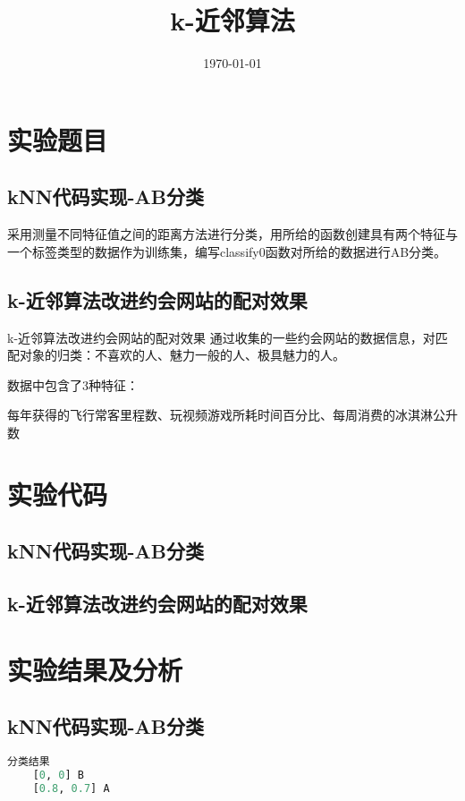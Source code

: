 \documentclass{../source/Experiment}
\title{k-近邻算法}
\date{\today}
\begin{document}
\makecover
\section{实验题目}
\subsection{kNN代码实现-AB分类}
采用测量不同特征值之间的距离方法进行分类，用所给的函数创建具有两个特征与一个标签类型的数据作为训练集，编写classify0函数对所给的数据进行AB分类。
\subsection{k-近邻算法改进约会网站的配对效果}
k-近邻算法改进约会网站的配对效果
通过收集的一些约会网站的数据信息，对匹配对象的归类：不喜欢的人、魅力一般的人、极具魅力的人。

数据中包含了3种特征：

每年获得的飞行常客里程数、玩视频游戏所耗时间百分比、每周消费的冰淇淋公升数

\section{实验代码}
\subsection{kNN代码实现-AB分类}


\subsection{k-近邻算法改进约会网站的配对效果}

\section{实验结果及分析}
\subsection{kNN代码实现-AB分类}
\begin{lstlisting}[language=Python]
    分类结果
    [0, 0] B
    [0.8, 0.7] A
    \end{lstlisting}
\end{document}
